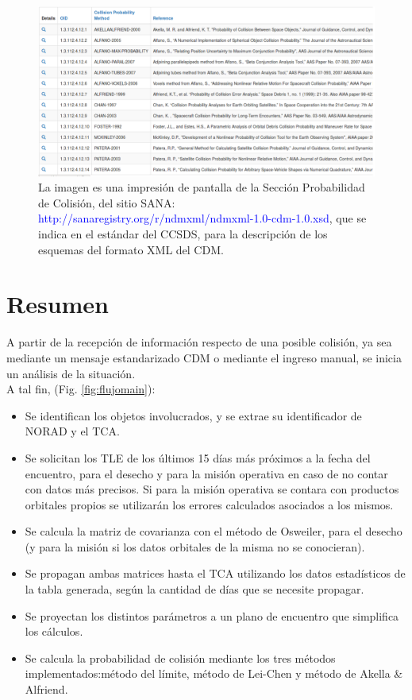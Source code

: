 \begin{figure}[!h]
\centering
\includegraphics[width=\textwidth]{imagenes/sanaPoCmetodos}
\caption[M\'etodos de c\'alculo de PoC - (Sitio Web SANA)]{ La imagen es una impresi\'on de pantalla de la Secci\'on Probabilidad de Colisi\'on, del sitio SANA: \textcolor{blue}{http://sanaregistry.org/r/ndmxml/ndmxml-1.0-cdm-1.0.xsd}, que se indica en el est\'andar del CCSDS, para la descripci\'on de los esquemas del formato XML del CDM.}
\label{fig:pagsana}
\end{figure}

\section{Resumen}
A partir de la recepci\'on de informaci\'on respecto de una posible colisi\'on, ya sea mediante un mensaje estandarizado CDM o mediante el ingreso manual, se inicia un an\'alisis de la situaci\'on.\\
A tal fin, (Fig. \ref{fig:flujomain}):\\

\begin{itemize}
\itemsep0em
\item Se identifican los objetos involucrados, y se extrae su identificador de NORAD y el TCA.
\item Se solicitan los TLE de los \'ultimos 15 d\'ias m\'as pr\'oximos a la fecha del encuentro, para el desecho y para la misi\'on operativa en caso de no contar con datos m\'as precisos. Si para la misi\'on operativa se contara con productos orbitales propios se utilizar\'an los errores calculados asociados a los mismos.
\item Se calcula la matriz de covarianza con el m\'etodo de Osweiler, \citep{osweiler} para el desecho (y para la misi\'on si los datos orbitales de la misma no se conocieran).
\item Se propagan ambas matrices hasta el TCA utilizando los datos estad\'isticos de la tabla generada, seg\'un la cantidad de d\'ias que se necesite propagar.
\item Se proyectan los distintos par\'ametros a un plano de encuentro que simplifica los c\'alculos.
\item Se calcula la probabilidad de colisi\'on mediante los tres m\'etodos implementados:m\'etodo del l\'imite, m\'etodo de Lei-Chen y m\'etodo de Akella \& Alfriend.
\end{itemize}

